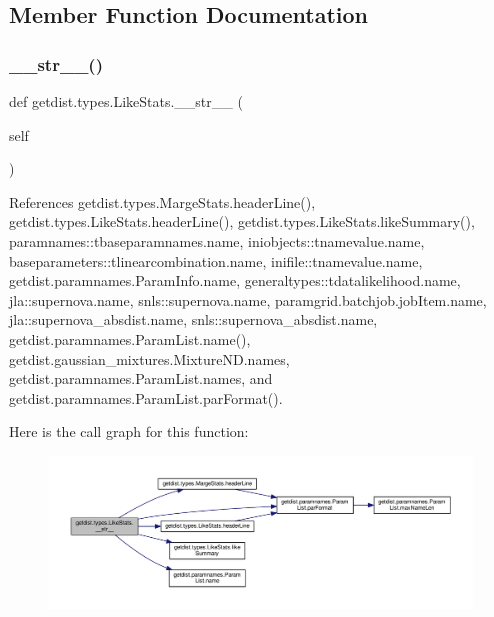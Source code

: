 \subsection{Member Function Documentation}
\mbox{\label{classgetdist_1_1types_1_1LikeStats_a3ce71c62a144f3267a48a82e45bc35fa}} 
\subsubsection{\texorpdfstring{\+\_\+\+\_\+str\+\_\+\+\_\+()}{\_\_str\_\_()}}
{\footnotesize\ttfamily def getdist.\+types.\+Like\+Stats.\+\_\+\+\_\+str\+\_\+\+\_\+ (\begin{DoxyParamCaption}\item[{}]{self }\end{DoxyParamCaption})}



References getdist.\+types.\+Marge\+Stats.\+header\+Line(), getdist.\+types.\+Like\+Stats.\+header\+Line(), getdist.\+types.\+Like\+Stats.\+like\+Summary(), paramnames\+::tbaseparamnames.\+name, iniobjects\+::tnamevalue.\+name, baseparameters\+::tlinearcombination.\+name, inifile\+::tnamevalue.\+name, getdist.\+paramnames.\+Param\+Info.\+name, generaltypes\+::tdatalikelihood.\+name, jla\+::supernova.\+name, snls\+::supernova.\+name, paramgrid.\+batchjob.\+job\+Item.\+name, jla\+::supernova\+\_\+absdist.\+name, snls\+::supernova\+\_\+absdist.\+name, getdist.\+paramnames.\+Param\+List.\+name(), getdist.\+gaussian\+\_\+mixtures.\+Mixture\+N\+D.\+names, getdist.\+paramnames.\+Param\+List.\+names, and getdist.\+paramnames.\+Param\+List.\+par\+Format().

Here is the call graph for this function\+:
\nopagebreak
\begin{figure}[H]
\begin{center}
\leavevmode
\includegraphics[width=350pt]{classgetdist_1_1types_1_1LikeStats_a3ce71c62a144f3267a48a82e45bc35fa_cgraph}
\end{center}
\end{figure}
\mbox{\label{classgetdist_1_1types_1_1LikeStats_affb93f8ca31099d4168b00a6beceb015}} 
